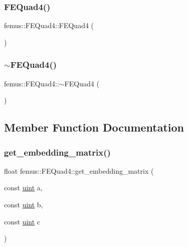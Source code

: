 \subsubsection{\texorpdfstring{F\+E\+Quad4()}{FEQuad4()}}
{\footnotesize\ttfamily femus\+::\+F\+E\+Quad4\+::\+F\+E\+Quad4 (\begin{DoxyParamCaption}{ }\end{DoxyParamCaption})}

\mbox{\label{classfemus_1_1_f_e_quad4_aed2a1a74edd5656589330752af452d43}} 
\subsubsection{\texorpdfstring{$\sim$\+F\+E\+Quad4()}{~FEQuad4()}}
{\footnotesize\ttfamily femus\+::\+F\+E\+Quad4\+::$\sim$\+F\+E\+Quad4 (\begin{DoxyParamCaption}{ }\end{DoxyParamCaption})}



\subsection{Member Function Documentation}
\mbox{\label{classfemus_1_1_f_e_quad4_a1532326493b4b2477fffa1b97617fb99}} 
\subsubsection{\texorpdfstring{get\+\_\+embedding\+\_\+matrix()}{get\_embedding\_matrix()}}
{\footnotesize\ttfamily float femus\+::\+F\+E\+Quad4\+::get\+\_\+embedding\+\_\+matrix (\begin{DoxyParamCaption}\item[{const \mbox{\hyperlink{_typedefs_8hpp_a91ad9478d81a7aaf2593e8d9c3d06a14}{uint}}}]{a,  }\item[{const \mbox{\hyperlink{_typedefs_8hpp_a91ad9478d81a7aaf2593e8d9c3d06a14}{uint}}}]{b,  }\item[{const \mbox{\hyperlink{_typedefs_8hpp_a91ad9478d81a7aaf2593e8d9c3d06a14}{uint}}}]{c }\end{DoxyParamCaption})\hspace{0.3cm}{\ttfamily [virtual]}}




